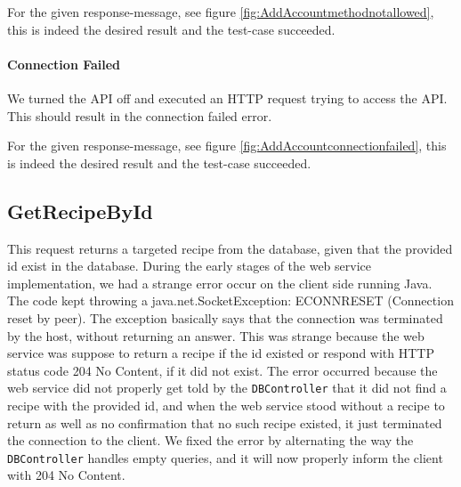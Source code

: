 For the given response-message, see figure \ref{fig:AddAccountmethodnotallowed}, this is indeed the desired result and the test-case succeeded.
\paragraph{Connection Failed}
We turned the API off and executed an HTTP request trying to access the API. This should result in the connection failed error. 

For the given response-message, see figure \ref{fig:AddAccountconnectionfailed}, this is indeed the desired result and the test-case succeeded.

\subsection{GetRecipeById}
This request returns a targeted recipe from the database, given that the provided id exist in the database. During the early stages of the web service implementation, we had a strange error occur on the client side running Java. The code kept throwing a java.net.SocketException: ECONNRESET (Connection reset by peer)\cite{socketexception}. The exception basically says that the connection was terminated by the host, without returning an answer. This was strange because the web service was suppose to return a recipe if the id existed or respond with HTTP status code 204 No Content, if it did not exist. The error occurred because the web service did not properly get told by the \texttt{DBController} that it did not find a recipe with the provided id, and when the web service stood without a recipe to return as well as no confirmation that no such recipe existed, it just terminated the connection to the client. We fixed the error by alternating the way the \texttt{DBController} handles empty queries, and it will now properly inform the client with 204 No Content.


